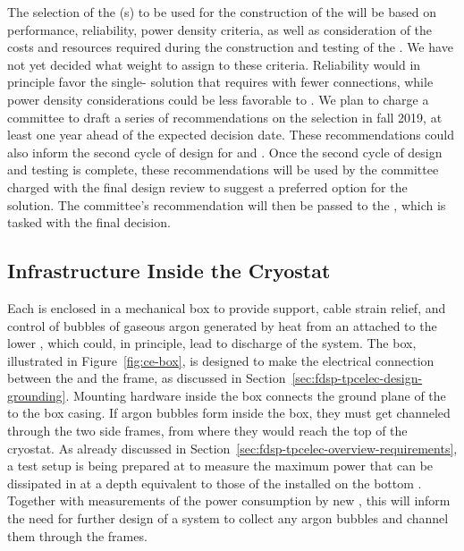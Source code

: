 The selection of the (s) to be used for the
construction of the   will be
based on performance, reliability, power density
criteria, as well as consideration of the costs and
resources required during the construction and testing
of the . We have not yet decided what weight 
to assign to these criteria. Reliability would in principle favor
the single- solution that requires 
 with fewer connections, while power 
density considerations could be less favorable to .
We plan to charge a committee to draft a series of recommendations 
on the  selection in fall 2019, at least one year
ahead of the expected decision date. These recommendations could 
also inform the second cycle of design for
 and . Once the second cycle of design
and testing is complete, these recommendations will be used by the
committee charged with the final design review to suggest a
preferred option for the  solution.
The committee's recommendation 
will then be passed to the  , 
which is tasked with the final  decision.

\subsection{Infrastructure Inside the Cryostat}
\label{sec:fdsp-tpcelec-design-infrastructure}

Each  is enclosed in a mechanical  box 
to provide support, cable strain relief, and control of bubbles of gaseous
argon generated by heat from an  attached to the lower ,
which could, in principle, lead to discharge of the  system. The
 box, illustrated in Figure~\ref{fig:ce-box}, is designed to make the 
electrical connection between the  and the  
frame, as discussed %
in Section~\ref{sec:fdsp-tpcelec-design-grounding}.
Mounting hardware inside the  box connects the ground plane 
of the  to the box casing. If argon bubbles %
form inside
the  box, they must get %
channeled through the two side
 frames, from where they would reach the top of the cryostat.
As already discussed in Section~\ref{sec:fdsp-tpcelec-overview-requirements},
a test setup is being prepared at  to measure the
maximum power that can be dissipated in  at a
depth equivalent to those of the  installed on
the bottom . Together with measurements of the
power consumption by new , this will inform
the need for further design of a system to collect any
argon bubbles and channel them through the  frames.

